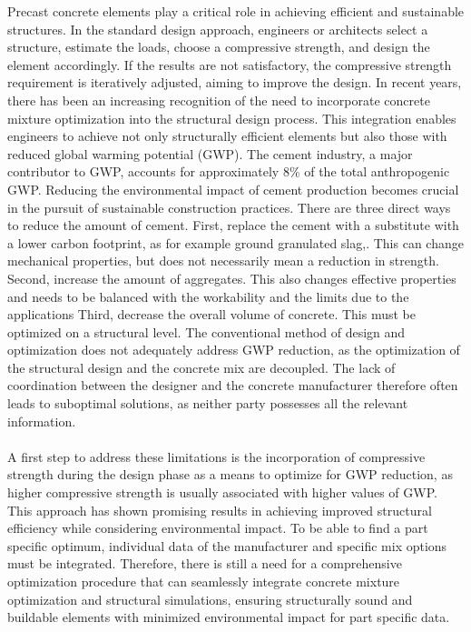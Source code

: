 Precast concrete elements play a critical role in achieving efficient and sustainable structures. 
In the standard design approach, engineers or architects select a structure, estimate the loads, choose a compressive strength, and design the element accordingly. 
If the results are not satisfactory, the compressive strength requirement is iteratively adjusted, aiming to improve the design.
In recent years, there has been an increasing recognition of the need to incorporate concrete mixture optimization into the structural design process. 
This integration enables engineers to achieve not only structurally efficient elements but also those with reduced global warming potential (GWP). 
The cement industry, a major contributor to GWP, accounts for approximately 8\% of the total anthropogenic GWP. 
Reducing the environmental impact of cement production becomes crucial in the pursuit of sustainable construction practices.
There are three direct ways to reduce the amount of cement.
First, replace the cement with a substitute with a lower carbon footprint, as for example ground granulated slag,.
This can change mechanical properties, but does not necessarily mean a reduction in strength.
Second, increase the amount of aggregates.
This also changes effective properties and needs to be balanced with the workability and the limits due to the applications
Third, decrease the overall volume of concrete.
This must be optimized on a structural level.
The conventional method of design and optimization does not adequately address GWP reduction, as the optimization of the structural design and the concrete mix are decoupled.
The lack of coordination between the designer and the concrete manufacturer therefore often leads to suboptimal solutions, as neither party possesses all the relevant information.\\\\
%
A first step to address these limitations is the incorporation of compressive strength during the design phase as a means to optimize for GWP reduction, as higher compressive strength is usually associated with higher values of GWP. 
This approach has shown promising results in achieving improved structural efficiency while considering environmental impact.
To be able to find a part specific optimum, individual data of the manufacturer and specific mix options must be integrated.
Therefore, there is still a need for a comprehensive optimization procedure that can seamlessly integrate concrete mixture optimization and structural simulations, ensuring structurally sound and buildable elements with minimized environmental impact for part specific data.\\\\
